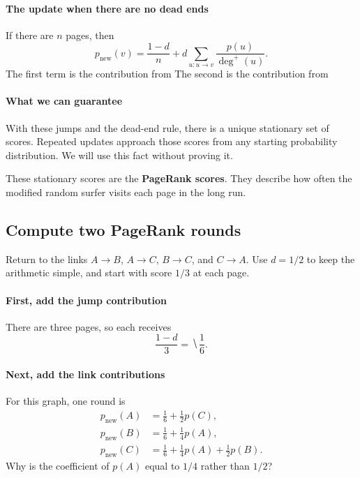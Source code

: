 \documentclass[11pt]{article}
\begin{document}
\paragraph{The update when there are no dead ends}
If there are $n$ pages, then
\begin{equation*}
    p_{\mathrm{new}}(v)=\frac{1-d}{n}
      +d\sum_{u:u\to v}\frac{p(u)}{\deg^+(u)}.
\end{equation*}
The first term is the contribution from  The second is
the contribution from 

\paragraph{What we can guarantee}
With these jumps and the dead-end rule, there is a unique stationary set of
scores. Repeated updates approach those scores from any starting probability
distribution. We will use this fact without proving it.

\vfill
These stationary scores are the \textbf{PageRank scores}. They describe how
often the modified random surfer visits each page in the long run.

\newpage
\subsection*{Compute two PageRank rounds}
Return to the links $A\to B$, $A\to C$, $B\to C$, and $C\to A$.
Use $d=1/2$ to keep the arithmetic simple, and start with score $1/3$ at each page.

\paragraph{First, add the jump contribution}
There are three pages, so each receives
\begin{equation*}
    \frac{1-d}{3}=\hide{\frac16}.
\end{equation*}

\paragraph{Next, add the link contributions}
For this graph, one round is
\begin{equation*}
    \begin{aligned}
        p_{\mathrm{new}}(A)&=\frac16+\frac12p(C),\\
        p_{\mathrm{new}}(B)&=\frac16+\frac14p(A),\\
        p_{\mathrm{new}}(C)&=\frac16+\frac14p(A)+\frac12p(B).
    \end{aligned}
\end{equation*}
Why is the coefficient of $p(A)$ equal to $1/4$ rather than $1/2$?
\vs{.6cm}
\end{document}
